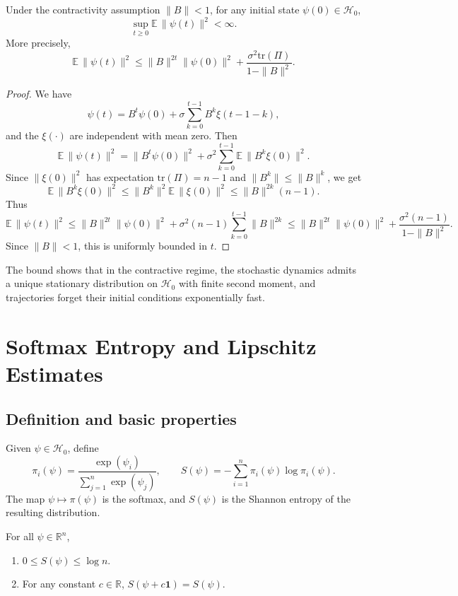 \documentclass[11pt]{article}
\begin{document}
\begin{proposition}
\label{prop:second-moment}
Under the contractivity assumption \(\|B\|<1\), for any initial state
\(\psi(0)\in\mathcal{H}_0\),
\[
\sup_{t\ge 0} \mathbb{E}\,\|\psi(t)\|^2 < \infty.
\]
More precisely,
\[
\mathbb{E}\,\|\psi(t)\|^2
  \le \|B\|^{2t} \|\psi(0)\|^2
      + \frac{\sigma^2 \mathrm{tr}(\Pi)}{1 - \|B\|^2}.
\]
\end{proposition}

\begin{proof}
We have
\[
\psi(t) = B^t \psi(0) + \sigma \sum_{k=0}^{t-1} B^k \xi(t-1-k),
\]
and the \(\xi(\cdot)\) are independent with mean zero. Then
\[
\mathbb{E}\,\|\psi(t)\|^2
  = \|B^t \psi(0)\|^2
    + \sigma^2 \sum_{k=0}^{t-1} \mathbb{E}\,\|B^k \xi(0)\|^2.
\]
Since \(\|\xi(0)\|^2\) has expectation \(\mathrm{tr}(\Pi) = n-1\) and
\(\|B^k\|\le \|B\|^k\), we get
\[
\mathbb{E}\,\|B^k \xi(0)\|^2
 \le \|B^k\|^2 \mathbb{E}\,\|\xi(0)\|^2
 \le \|B\|^{2k} (n-1).
\]
Thus
\[
\mathbb{E}\,\|\psi(t)\|^2
  \le \|B\|^{2t} \|\psi(0)\|^2
     + \sigma^2 (n-1)\sum_{k=0}^{t-1} \|B\|^{2k}
  \le \|B\|^{2t} \|\psi(0)\|^2
     + \frac{\sigma^2 (n-1)}{1 - \|B\|^2}.
\]
Since \(\|B\|<1\), this is uniformly bounded in \(t\).
\end{proof}

The bound shows that in the contractive regime, the stochastic dynamics
admits a unique stationary distribution on \(\mathcal{H}_0\) with finite
second moment, and trajectories forget their initial conditions
exponentially fast.

\section{Softmax Entropy and Lipschitz Estimates}

\subsection{Definition and basic properties}

Given \(\psi\in\mathcal{H}_0\), define
\[
\pi_i(\psi) = \frac{\exp(\psi_i)}{\sum_{j=1}^n \exp(\psi_j)},\qquad
S(\psi) = -\sum_{i=1}^n \pi_i(\psi) \log \pi_i(\psi).
\]
The map \(\psi\mapsto \pi(\psi)\) is the softmax, and \(S(\psi)\) is
the Shannon entropy of the resulting distribution.

\begin{lemma}
\label{lem:entropy-bounds}
For all \(\psi\in\mathbb{R}^n\),
\begin{enumerate}
  \item \(0 \le S(\psi) \le \log n\).
  \item For any constant \(c\in\mathbb{R}\),
        \(S(\psi + c\mathbf{1}) = S(\psi)\).
\end{enumerate}
\end{lemma}
\end{document}
